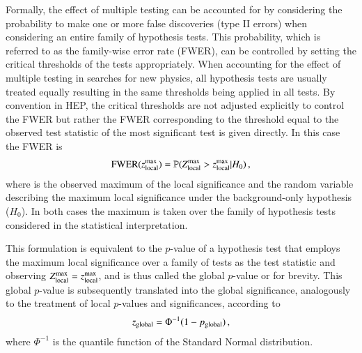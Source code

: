 Formally, the effect of multiple testing can be accounted for by
considering the probability to make one or more false discoveries
(type II errors) when considering an entire family of hypothesis
tests.
This probability, which is referred to as the family-wise error rate
(FWER), can be controlled by setting the critical thresholds of the
tests appropriately. When accounting for the effect of multiple
testing in searches for new physics, all hypothesis tests are usually
treated equally resulting in the same thresholds being applied in all
tests. By convention in HEP, the critical thresholds are not adjusted
explicitly to control the FWER but rather the FWER corresponding to
the threshold equal to the observed test statistic of the most
significant test is given directly. In this case the FWER is
\begin{align*}
  \text{FWER}(z_{\text{local}}^{\text{max}})
  = \mathbb{P}(Z_{\text{local}}^{\text{max}} > z_{\text{local}}^{\text{max}} \vert H_0)\,\text{,}
\end{align*}
where \zmaxlocal is the observed maximum of the local significance and
\Zmaxlocal the random variable describing the maximum local
significance under the background-only hypothesis ($H_0$). In both
cases the maximum is taken over the family of hypothesis tests
considered in the statistical interpretation.


This formulation %
is equivalent to the $p$-value of a hypothesis test that employs the
maximum local significance over a family of tests as the test
statistic and observing $Z_{\text{local}}^{\text{max}} = z_{\text{local}}^{\text{max}}$, and is thus called
the global $p$-value or \pglobal for brevity. This global $p$-value is
subsequently translated into the global significance, analogously to
the treatment of local $p$-values and significances, according to
\begin{align*}
  z_{\text{global}} = \Phi^{-1}(1 - p_{\text{global}}) \,\text{,}
\end{align*}
where $\Phi^{-1}$ is the quantile function of the Standard Normal
distribution.

